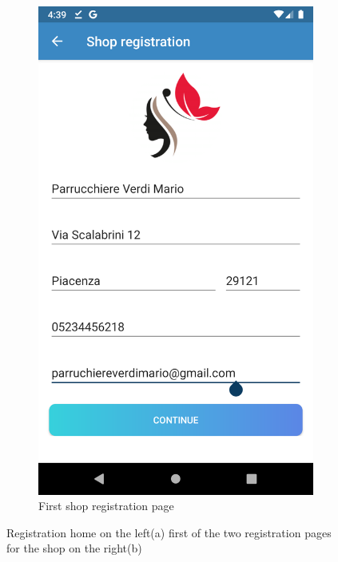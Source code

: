 \begin{figure}[h]
\begin{subfigure}{.5\textwidth}
  \includegraphics[height=.4\textheight, keepaspectratio=true]{Img/Screens/Registration_Shop1}
  \caption{First shop registration page}
\end{subfigure}
\caption{Registration home on the left(a) first of the two registration pages for the shop on the right(b)}
\end{figure}

